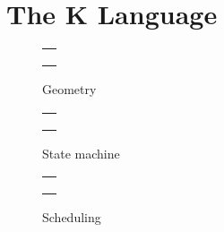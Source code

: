 \section{The K Language}



\begin{figure}
\centering
\begin{tabular}{c}
\hline \\
 \\ \\
\hline
\end{tabular}
\caption{Geometry}
\label{fig:shapes}
\end{figure}

\begin{figure}
\centering
\begin{tabular}{c}
\hline \\
 \\ \\
\hline
\end{tabular}
\caption{State machine}
\label{fig:statemachine}
\end{figure}

\begin{figure}
\centering
\begin{tabular}{c}
\hline \\
 \\ \\
\hline
\end{tabular}
\caption{Scheduling}
\label{fig:scheduling}
\end{figure}
